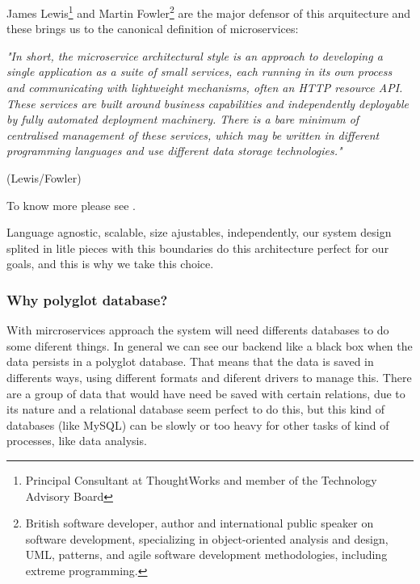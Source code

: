 \noindent James Lewis\footnote{Principal Consultant at ThoughtWorks and
member of the Technology Advisory Board} and Martin Fowler\footnote{British software developer,
author and international public speaker on software development, specializing in
object-oriented analysis and design, UML, patterns, and agile software development
methodologies, including extreme programming.} are the major defensor of this
arquitecture and these brings us to the canonical definition of microservices:
\bigskip

\begin{minipage}{0.9\linewidth}
        \vspace{5pt}
        {\small
        \textit{"In short, the microservice architectural style is an approach to developing a
        single application as a suite of small services, each running in its own process
        and communicating with lightweight mechanisms, often an HTTP resource API.
        These services are built around business capabilities and independently deployable
        by fully automated deployment machinery. There is a bare minimum of centralised management
        of these services, which may be written in different programming languages and
        use different data storage technologies."}
        }
        \begin{flushright}
            (Lewis/Fowler)
        \end{flushright}
        \vspace{5pt}
    \end{minipage}

To know more please see \cite{Fowler14Micro}.


\noindent Language agnostic, scalable, size ajustables, independently, our system design
splited in litle pieces with this boundaries do this architecture perfect for
our goals, and this is why we take this choice.

\subsubsection{Why polyglot database?}

With mircroservices approach the system will need differents databases to do
some diferent things. In general we can see our
backend like a black box when the data persists in a polyglot database.
That means that the data is saved in differents ways, using different
formats and diferent drivers to manage this. There are a group of
data that would have need be saved with certain relations, due to its nature
and a relational database seem perfect to do this, but this kind of
databases (like MySQL) can be slowly or too heavy for other tasks
of kind of processes, like data analysis.


